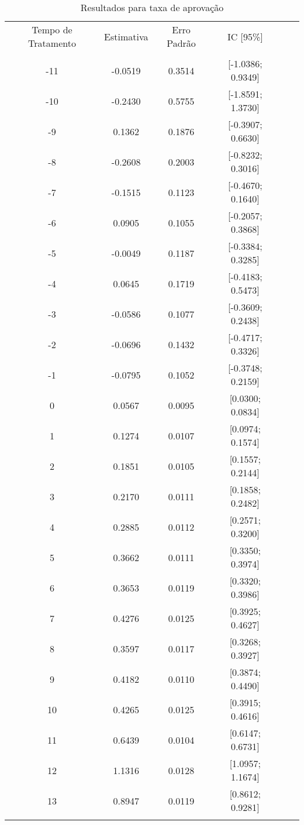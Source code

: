 \documentclass[
        12pt,                           %
        openright,                      %
        oneside,
        a4paper,                        %
        chapter=TITLE,         %
        section=TITLE,         %
        subsection=Title,      %
        english,                        %
        spanish,                        %
        portugues,                      %
        ]{abntex2}
\begin{document}
{\begin{apendicesenv}
\begin{table}[htbp]
\caption{Resultados para taxa de aprovação}
\centering
\begin{tabular}{cccccc}
\\ \hline
Tempo de Tratamento & Estimativa & Erro Padrão & IC [95\%] \\
\\ \hline
-11 & -0.0519 & 0.3514 & [-1.0386; 0.9349] \\
-10 & -0.2430 & 0.5755 & [-1.8591; 1.3730] \\
-9 & 0.1362 & 0.1876 & [-0.3907; 0.6630] \\
-8 & -0.2608 & 0.2003 & [-0.8232; 0.3016] \\
-7 & -0.1515 & 0.1123 & [-0.4670; 0.1640] \\
-6 & 0.0905 & 0.1055 & [-0.2057; 0.3868] \\
-5 & -0.0049 & 0.1187 & [-0.3384; 0.3285] \\
-4 & 0.0645 & 0.1719 & [-0.4183; 0.5473] \\
-3 & -0.0586 & 0.1077 & [-0.3609; 0.2438] \\
-2 & -0.0696 & 0.1432 & [-0.4717; 0.3326] \\
-1 & -0.0795 & 0.1052 & [-0.3748; 0.2159] \\
0 & 0.0567 & 0.0095 & [0.0300; 0.0834] \\
1 & 0.1274 & 0.0107 & [0.0974; 0.1574] \\
2 & 0.1851 & 0.0105 & [0.1557; 0.2144] \\
3 & 0.2170 & 0.0111 & [0.1858; 0.2482] \\
4 & 0.2885 & 0.0112 & [0.2571; 0.3200] \\
5 & 0.3662 & 0.0111 & [0.3350; 0.3974] \\
6 & 0.3653 & 0.0119 & [0.3320; 0.3986] \\
7 & 0.4276 & 0.0125 & [0.3925; 0.4627] \\
8 & 0.3597 & 0.0117 & [0.3268; 0.3927] \\
9 & 0.4182 & 0.0110 & [0.3874; 0.4490] \\
10 & 0.4265 & 0.0125 & [0.3915; 0.4616] \\
11 & 0.6439 & 0.0104 & [0.6147; 0.6731] \\
12 & 1.1316 & 0.0128 & [1.0957; 1.1674] \\
13 & 0.8947 & 0.0119 & [0.8612; 0.9281] \\
\\ \hline
\end{tabular}
\label{tab:resultados_aprovacao}
\end{table}


\end{apendicesenv}}
\end{document}
